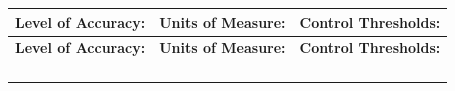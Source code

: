\documentclass[10pt,letterpaper]{article}
\renewcommand\arraystretch{1.25}
\begin{document}
\begin{center}
\begingroup
\setlength\tabcolsep{2.0pt}
\footnotesize
\renewcommand\arraystretch{1.55}
\begin{longtable}{|>{\raggedright\arraybackslash}p{2.120in}|>{\raggedright\arraybackslash}p{2.120in}|>{\raggedright\arraybackslash}p{2.120in}|}
\hline
\rowcolor{light}
\textbf{Level of Accuracy:} & \textbf{Units of Measure:} & \textbf{Control Thresholds:} \\ \hline
\endfirsthead
\hline\rowcolor{light} \textbf{Level of Accuracy:} & \textbf{Units of Measure:} & \textbf{Control Thresholds:} \\ \hline
\endhead
\rule{0pt}{11pt}\hspace{0pt} & \rule{0pt}{11pt}\hspace{0pt} & \rule{0pt}{11pt}\hspace{0pt} \\ \hline
\rule{0pt}{11pt}\hspace{0pt} & \rule{0pt}{11pt}\hspace{0pt} & \rule{0pt}{11pt}\hspace{0pt} \\ \hline
\rule{0pt}{11pt}\hspace{0pt} & \rule{0pt}{11pt}\hspace{0pt} & \rule{0pt}{11pt}\hspace{0pt} \\ \hline
\rule{0pt}{11pt}\hspace{0pt} & \rule{0pt}{11pt}\hspace{0pt} & \rule{0pt}{11pt}\hspace{0pt} \\ \hline
\end{longtable}
\endgroup
\end{center}
\end{document}
